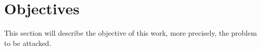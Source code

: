 \section{Objectives}
\label{sec:Objectives}
This section will describe the objective of this work, more precisely, the problem to be attacked.
